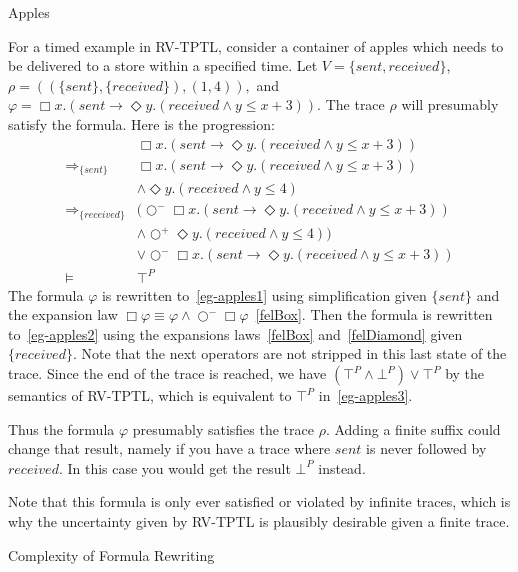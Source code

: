 \documentclass[a4paper]{article}
\newcommand{\sn}{\bigcirc^+}
\newcommand{\wn}{\bigcirc^-}
\newcommand{\rw}[1]{\Rightarrow_{#1}}
\begin{document}
\begin{eg}{Apples}

  For a timed example in RV-TPTL, consider a container of apples which needs to be delivered to a store within a specified time. Let $V=\{sent, received\}$, \(\rho=((\{sent\},\{received\}),(1,4)),\) and \(\varphi=\Box x. (sent \to \Diamond y. (received \land y \leq x + 3)).\)
  The trace $\rho$ will presumably satisfy the formula.
  Here is the progression:
  \begin{align}
    &\Box x. (sent \to \Diamond y. (received \land y \leq x + 3))\nonumber\\
    \rw{\{sent\}}
    &\Box x. (sent \to \Diamond y. (received \land y \leq x + 3))\nonumber\\
    &\land \Diamond y. (received \land y \leq 4)
    \label{eg-apples1}\\
    \rw{\{received\}}
    &(\wn \Box x. (sent \to \Diamond y. (received \land y \leq x + 3))\nonumber\\
    &\land \sn \Diamond y. (received \land y \leq 4))\nonumber\\
    &\lor \wn \Box x. (sent \to \Diamond y. (received \land y \leq x + 3))\label{eg-apples2}\\
    \vDash
    &\top^P\label{eg-apples3}
  \end{align}
  The formula $\varphi$ is rewritten to~\eqref{eg-apples1} using simplification given $\{sent\}$ and the expansion law $\Box \varphi \equiv \varphi \land \wn \Box \varphi$~\eqref{felBox}.
  Then the formula is rewritten to~\eqref{eg-apples2} using the expansions laws~\eqref{felBox} and~\eqref{felDiamond} given $\{received\}$.
  Note that the next operators are not stripped in this last state of the trace.
  Since the end of the trace is reached, we have $(\top^P \land \bot^P) \lor \top^P$ by the semantics of RV-TPTL, which is equivalent to $\top^P$ in~\eqref{eg-apples3}.

  Thus the formula $\varphi$ presumably satisfies the trace $\rho$.
  Adding a finite suffix could change that result, namely if you have a trace where $sent$ is never followed by $received$.
  In this case you would get the result $\bot^P$ instead.

  Note that this formula is only ever satisfied or violated by infinite traces, which is why the uncertainty given by RV-TPTL is plausibly desirable given a finite trace.
\end{eg}

\begin{remk}{Complexity of Formula Rewriting}
\end{remk}
\end{document}
